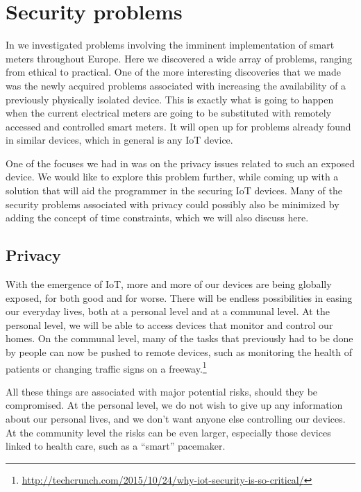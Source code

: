
\section{Security problems}
In \cite{prespecialization} we investigated problems involving the imminent implementation of smart meters throughout Europe.
Here we discovered a wide array of problems, ranging from ethical to practical.
One of the more interesting discoveries that we made was the newly acquired problems associated with increasing the availability of a previously physically isolated device.
This is exactly what is going to happen when the current electrical meters are going to be substituted with remotely accessed and controlled smart meters.
It will open up for problems already found in similar devices, which in general is any IoT device.

One of the focuses we had in \cite{prespecialization} was on the privacy issues related to such an exposed device.
We would like to explore this problem further, while coming up with a solution that will aid the programmer in the securing IoT devices.
Many of the security problems associated with privacy could possibly also be minimized by adding the concept of time constraints, which we will also discuss here.

\subsection{Privacy}
With the emergence of IoT, more and more of our devices are being globally exposed, for both good and for worse.
There will be endless possibilities in easing our everyday lives, both at a personal level and at a communal level.
At the personal level, we will be able to access devices that monitor and control our homes.
On the communal level, many of the tasks that previously had to be done by people can now be pushed to remote devices, such as monitoring the health of patients or changing traffic signs on a freeway.\footnote{\url{http://techcrunch.com/2015/10/24/why-iot-security-is-so-critical/}}

All these things are associated with major potential risks, should they be compromised.
At the personal level, we do not wish to give up any information about our personal lives, and we don't want anyone else controlling our devices.
At the community level the risks can be even larger, especially those devices linked to health care, such as a ``smart'' pacemaker.

